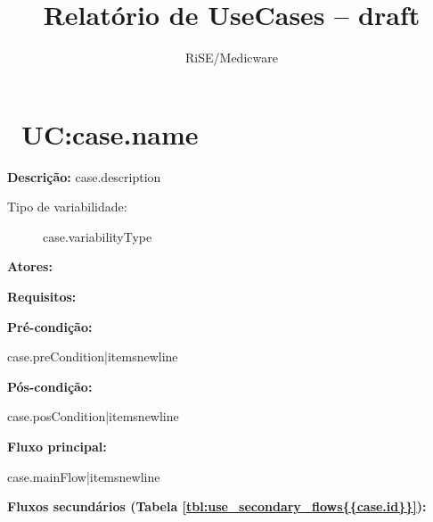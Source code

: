 \documentclass[10pt]{article}
\title{Relatório de UseCases -- draft} %
\author{RiSE/Medicware} %
\begin{document}
 

\maketitle

\newpage

\tableofcontents

\newpage

{%
	\section{~UC:{{case.name}}}
	\label{uc{{case.id}}}

	\textbf {Descrição:} {{case.description}}
	
	\begin{description}
  	  \item[Tipo de variabilidade:]  {{case.variabilityType}}
	\end{description}
	
	\noindent
	\textbf{Atores:} 
	
	\noindent
	\textbf{Requisitos:}
	
	\noindent
	\textbf{Pré-condição:} 
	\begin{itemize}
      {{case.preCondition|itemsnewline}}
	\end{itemize}
	
	\noindent
  	\textbf{Pós-condição:} 
  	\begin{itemize}
       {{case.posCondition|itemsnewline}}
	\end{itemize}
  	
  	\noindent
  	\textbf{Fluxo principal:} 
  	
  	\begin{itemize}
  	  {{case.mainFlow|itemsnewline}}
  	\end{itemize} 

\newline 

{%
	\noindent
	\textbf{Fluxos secundários (Tabela
	\ref{tbl:use_secondary_flows{{case.id}}}):}
	 
}}
\end{document}
